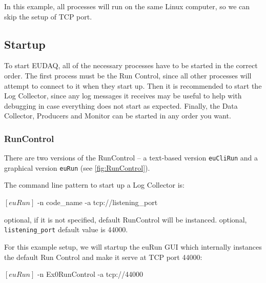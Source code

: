 In this example, all processes will run on the same Linux computer, so we can skip the setup of TCP port.

\subsection{Startup}
To start EUDAQ, all of the necessary processes have to be started in the correct order.
The first process must be the Run Control,
since all other processes will attempt to connect to it when they start up.
Then it is recommended to start the Log Collector,
since any log messages it receives may be useful
to help with debugging in case everything does not start as expected.
Finally, the Data Collector, Producers and Monitor can be started in any order you want.

\subsubsection{RunControl}
\label{sec:runcontrol}
There are two versions of the RunControl -- a text-based version \texttt{euCliRun} and a graphical version \texttt{euRun} (see \autoref{fig:RunControl}).

The command line pattern to start up a Log Collector is:
\begin{listing}[mybash]
$[euRun]$ -n {code_name} -a tcp://{listening_port}
\end{listing}

\begin{description}
optional, if it is not specified, default RunControl will be instanced. 
optional, \texttt{listening\_port} default value is 44000.
\end{description}

For this example setup, we will startup the euRun GUI which internally instances the default Run Control and make it serve at TCP port 44000:\\
\begin{listing}[mybash]
$[euRun]$ -n Ex0RunControl -a tcp://44000
\end{listing}

